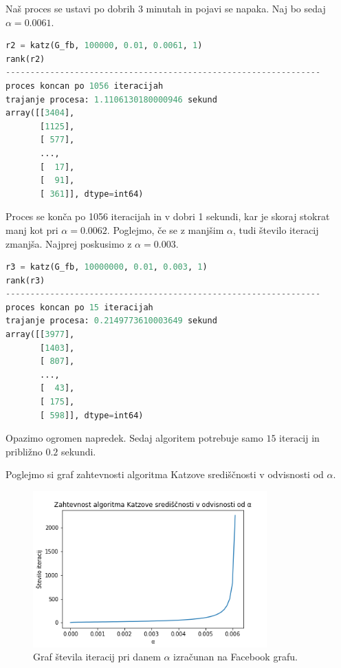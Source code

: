\documentclass[12pt,a4paper]{amsart}
\begin{document}
Naš proces se ustavi po dobrih 3 minutah in pojavi se napaka. Naj bo sedaj $\alpha = 0.0061.$

\begin{lstlisting}[language=Python]
r2 = katz(G_fb, 100000, 0.01, 0.0061, 1)
rank(r2)
----------------------------------------------------------------
proces koncan po 1056 iteracijah
trajanje procesa: 1.1106130180000946 sekund
array([[3404],
       [1125],
       [ 577],
       ...,
       [  17],
       [  91],
       [ 361]], dtype=int64)
\end{lstlisting}

Proces se konča po 1056 iteracijah in v dobri 1 sekundi, kar je skoraj stokrat manj kot pri $\alpha = 0.0062$. Poglejmo, če se z manjšim $\alpha$, tudi število iteracij zmanjša. Najprej poskusimo z $\alpha = 0.003.$

\begin{lstlisting}[language=Python]
r3 = katz(G_fb, 10000000, 0.01, 0.003, 1)
rank(r3)
----------------------------------------------------------------
proces koncan po 15 iteracijah
trajanje procesa: 0.2149773610003649 sekund
array([[3977],
       [1403],
       [ 807],
       ...,
       [  43],
       [ 175],
       [ 598]], dtype=int64)
\end{lstlisting}

Opazimo ogromen napredek. Sedaj algoritem potrebuje samo $15$ iteracij in približno $0.2$ sekundi.

Poglejmo si graf zahtevnosti algoritma Katzove središčnosti v odvisnosti od $\alpha.$

\begin{figure}[h]
\begin{center} 
\includegraphics[width=9cm]{Katz_alpha.png}
\caption[Zahtevnost algoritma Katzove središčnosti glede na $\alpha$]{Graf števila iteracij pri danem $\alpha$ izračunan na Facebook grafu.}
\end{center}
\end{figure}
\end{document}
